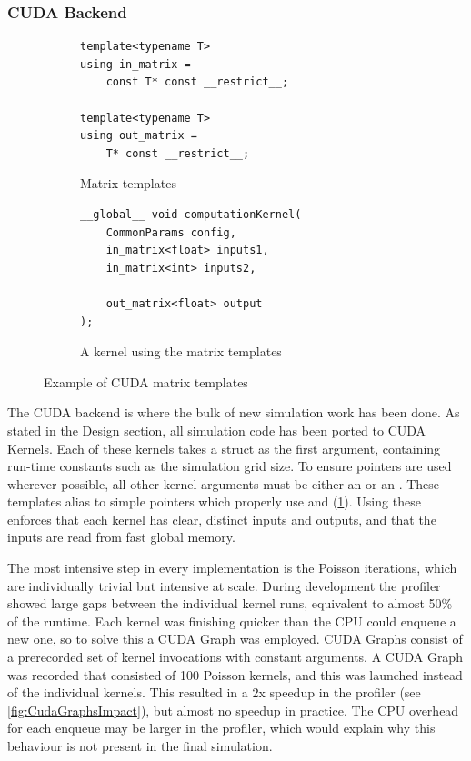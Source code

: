 \subsubsection{CUDA Backend}
\begin{figure}[t]
    \centering
    \begin{subfigure}{0.49\textwidth}
        \begin{verbatim}
template<typename T>
using in_matrix = 
    const T* const __restrict__;

template<typename T>
using out_matrix = 
    T* const __restrict__;
        \end{verbatim}
        \caption{Matrix templates}
    \end{subfigure}%
    \begin{subfigure}{0.49\textwidth}
        \begin{verbatim}
__global__ void computationKernel(
    CommonParams config,
    in_matrix<float> inputs1,
    in_matrix<int> inputs2,
    
    out_matrix<float> output
);
        \end{verbatim}
        \caption{A kernel using the matrix templates}
    \end{subfigure}
    \caption{Example of CUDA matrix templates}
    \label{fig:ImplMatrices}
\end{figure}

The CUDA backend is where the bulk of new simulation work has been done.
As stated in the Design section, all simulation code has been ported to CUDA Kernels.
Each of these kernels takes a  struct as the first argument, containing run-time constants such as the simulation grid size.
To ensure  pointers are used wherever possible, all other kernel arguments must be either an  or an .
These templates alias to simple pointers which properly use  and  (\cref{fig:ImplMatrices}).
Using these enforces that each kernel has clear, distinct inputs and outputs, and that the inputs are read from fast global memory.

The most intensive step in every implementation is the Poisson iterations, which are individually trivial but intensive at scale.
During development the profiler showed large gaps between the individual kernel runs, equivalent to almost 50\% of the runtime.
Each kernel was finishing quicker than the CPU could enqueue a new one, so to solve this a CUDA Graph was employed.
CUDA Graphs consist of a prerecorded set of kernel invocations with constant arguments.
A CUDA Graph was recorded that consisted of 100 Poisson kernels, and this was launched instead of the individual kernels.
This resulted in a 2x speedup in the profiler (see \cref{fig:CudaGraphsImpact}), but almost no speedup in practice.
The CPU overhead for each enqueue may be larger in the profiler, which would explain why this behaviour is not present in the final simulation.

